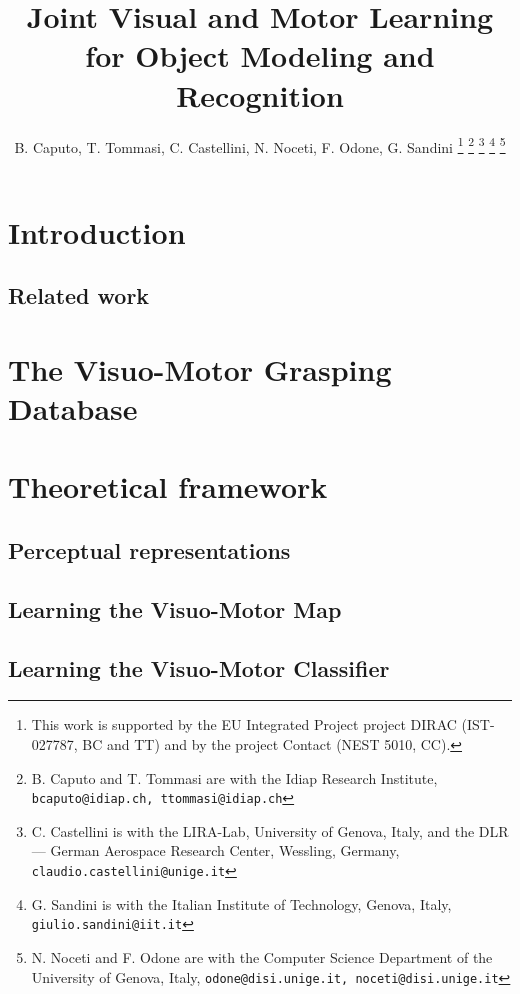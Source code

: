 \documentclass[a4paper,10pt,conference]{ieeeconf}
\title{\LARGE \bf
Joint Visual and Motor Learning for Object Modeling and Recognition
}
\author{B. Caputo, T. Tommasi, C. Castellini, N. Noceti, F. Odone, G. Sandini%
\thanks{This work is  supported by the EU Integrated Project project DIRAC (IST-027787, BC and TT) and by the
project Contact (NEST 5010, CC).}%
\thanks{B. Caputo and T. Tommasi are with the Idiap Research Institute,
        {\tt\small bcaputo@idiap.ch, ttommasi@idiap.ch}}%
\thanks{C. Castellini is with the LIRA-Lab, University of Genova, Italy, and the
        DLR --- German Aerospace Research Center, Wessling, Germany,
        {\tt\small claudio.castellini@unige.it}}%
\thanks{G. Sandini is with the Italian Institute of Technology, Genova, Italy,
        {\tt\small giulio.sandini@iit.it}}%
\thanks{N. Noceti and F. Odone are with the Computer Science Department of the University of Genova, Italy,
{\tt\small odone@disi.unige.it, noceti@disi.unige.it}}%
}
\begin{document}
\maketitle
\thispagestyle{empty}
\pagestyle{empty}

\begin{abstract}
  
\end{abstract}

\section{Introduction}
\label{sec::introduction}

\subsection{Related work}


\section{The Visuo-Motor Grasping Database}
\label{sec:database}

\section{Theoretical framework}
\label{sec::framework}

\subsection{Perceptual representations}
\label{sec::vision}

\subsection{Learning the Visuo-Motor Map}
\label{sec::regression}

\subsection{Learning the Visuo-Motor Classifier}
\label{sec::classifier}

%
\end{document}
